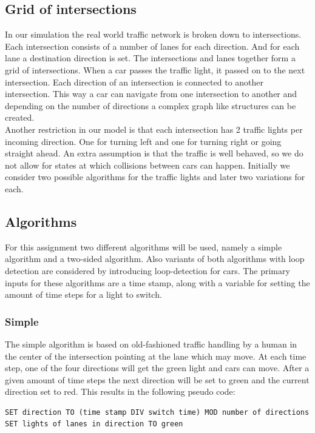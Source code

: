 \documentclass[a4paper,11pt]{article}
\begin{document}
\subsection{Grid of intersections}
In our simulation the real world traffic network is broken down to intersections.
Each intersection consists of a number of lanes for each direction.
And for each lane a destination direction is set.
The intersections and lanes together form a grid of intersections.
When a car passes the traffic light, it passed on to the next intersection.
Each direction of an intersection is connected to another intersection.
This way a car can navigate from one intersection to another and depending on the number of directions a complex graph like structures can be created.\\

\noindent Another restriction in our model is that each intersection has 2 traffic lights per incoming direction.
One for turning left and one for turning right or going straight ahead.
An extra assumption is that the traffic is well behaved, so we do not allow for states at which collisions between cars can happen.
Initially we consider two possible algorithms for the traffic lights and later two variations for each.

\subsection{Algorithms}

For this assignment two different algorithms will be used, namely a simple algorithm and a two-sided algorithm.
Also variants of both algorithms with loop detection are considered by introducing loop-detection for cars.
The primary inputs for these algorithms are a time stamp, along with a variable for setting the amount of time steps for a light to switch.

\subsubsection*{Simple}
The simple algorithm is based on old-fashioned traffic handling by a human in the center of the intersection pointing at the lane which may move.
At each time step, one of the four directions will get the green light and cars can move.
After a given amount of time steps the next direction will be set to green and the current direction set to red.
This results in the following pseudo code:

\begin{lstlisting}
SET direction TO (time stamp DIV switch time) MOD number of directions
SET lights of lanes in direction TO green
\end{lstlisting}
\end{document}
